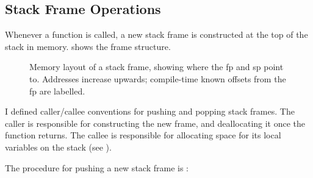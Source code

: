 \documentclass[00-main.tex]{subfiles}
\begin{document}
\subsection{Stack Frame Operations}

Whenever a function is called, a new stack frame is constructed at the top of the stack in memory.
 shows the frame structure.

\begin{figure}[!t]
  \centering
  \caption{\protect{}\protect{}%
    Memory layout of a stack frame, showing where the \gls{fp} and \gls{sp} point to.
    Addresses increase upwards; compile-time known offsets from the \gls{fp} are labelled.
  }%
  \label{fig:stack frame layout}
\end{figure}

I defined caller/callee conventions for pushing and popping stack frames.
The caller is responsible for constructing the new frame, and deallocating it once the function returns.
The callee is responsible for allocating space for its local variables on the stack (see ).

The procedure for pushing a new stack frame is :

\end{document}
